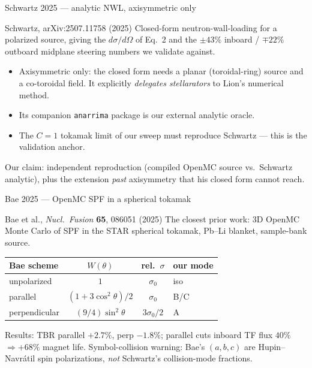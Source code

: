 \documentclass[aspectratio=169]{beamer}
\newcommand{\sigo}{\sigma_0}
\begin{document}
\begin{frame}[t]{Schwartz 2025 --- analytic NWL, axisymmetric only}
\begin{block}{Schwartz, arXiv:2507.11758 (2025)}
Closed-form neutron-wall-loading for a polarized source, giving the $d\sigma/d\Omega$ of Eq.~2 and the $\pm43\%$ inboard / $\mp22\%$ outboard midplane steering numbers we validate against.
\end{block}
\begin{itemize}
  \item \alert{Axisymmetric only:} the closed form needs a planar (toroidal-ring) source and a co-toroidal field. It explicitly \emph{delegates stellarators} to Lion's numerical method.
  \item Its companion \texttt{anarrima} package is our external analytic oracle.
  \item The $C=1$ tokamak limit of our sweep must reproduce Schwartz --- this is the validation anchor.
\end{itemize}
Our claim: independent reproduction (compiled OpenMC source vs.\ Schwartz analytic), plus the extension \emph{past} axisymmetry that his closed form cannot reach.
\end{frame}

\begin{frame}[t]{Bae 2025 --- OpenMC SPF in a spherical tokamak}
\begin{block}{Bae et al., \emph{Nucl.\ Fusion} \textbf{65}, 086051 (2025)}
The closest prior work: 3D OpenMC Monte Carlo of SPF in the STAR spherical tokamak, Pb--Li blanket, sample-bank source.
\end{block}
\renewcommand{\arraystretch}{1.1}
\begin{center}
\begin{tabular}{lccl}
\toprule
Bae scheme & $W(\theta)$ & rel.\ $\sigma$ & our mode \\
\midrule
unpolarized & $1$ & $\sigo$ & iso \\
parallel & $(1+3\cos^2\theta)/2$ & $\sigo$ & B/C \\
perpendicular & $(9/4)\sin^2\theta$ & $3\sigo/2$ & A \\
\bottomrule
\end{tabular}
\end{center}
Results: TBR parallel $+2.7\%$, perp $-1.8\%$; parallel cuts inboard TF flux $40\%$ $\Rightarrow +68\%$ magnet life. \alert{Symbol-collision warning:} Bae's $(a,b,c)$ are Hupin--Navr\'atil spin polarizations, \emph{not} Schwartz's collision-mode fractions.
\end{frame}
\end{document}
